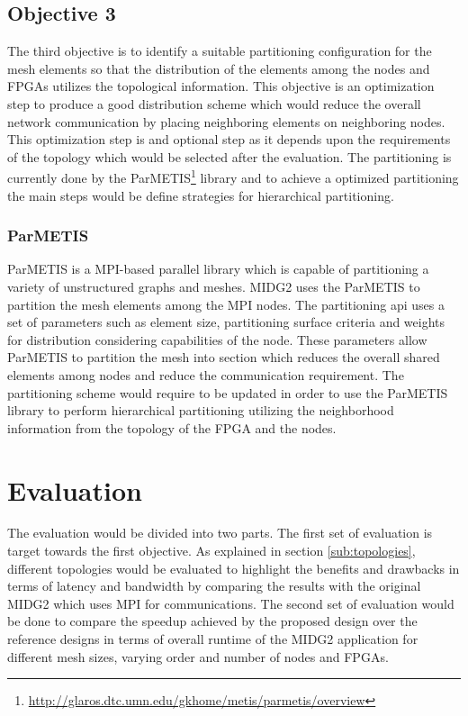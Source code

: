 \documentclass[english,notitlepage]{hgbreport}
\begin{document}
\subsection{Objective 3}

The third objective is to identify a suitable partitioning configuration for the mesh elements so that
the distribution of the elements among the nodes and FPGAs utilizes the topological information. 
This objective is an optimization step to produce a good distribution scheme which would reduce
the overall network communication by placing neighboring elements on neighboring nodes. This optimization
step is and optional step as it depends upon the requirements of the topology which would be selected after the
evaluation. The partitioning is currently done by the ParMETIS\footnote{\url{http://glaros.dtc.umn.edu/gkhome/metis/parmetis/overview}}
library and to achieve a optimized partitioning the main steps would be define strategies for hierarchical partitioning.

\subsubsection{ParMETIS}

ParMETIS is a MPI-based parallel library which is capable of partitioning a variety of unstructured graphs and meshes. MIDG2
uses the ParMETIS to partition the mesh elements among the MPI nodes. The partitioning api uses a set of parameters such as element
size, partitioning surface criteria and weights for distribution considering capabilities of the node. These parameters allow
ParMETIS to partition the mesh into section which reduces the overall shared elements among nodes and reduce the communication requirement.
The partitioning scheme would require to be updated in order to use the ParMETIS library to perform hierarchical partitioning
utilizing the neighborhood information from the topology of the FPGA and the nodes.

\section{Evaluation}

The evaluation would be divided into two parts. The first set of evaluation is target towards the first objective.
As explained in section \ref{sub:topologies}, different topologies would be evaluated to highlight the benefits
and drawbacks in terms of latency and bandwidth by comparing the results with the original MIDG2 which uses MPI
for communications. The second set of evaluation would be done to compare the speedup achieved by the proposed
design over the reference designs in terms of overall runtime of the MIDG2 application for different mesh
sizes, varying order and number of nodes and FPGAs.  
\end{document}
